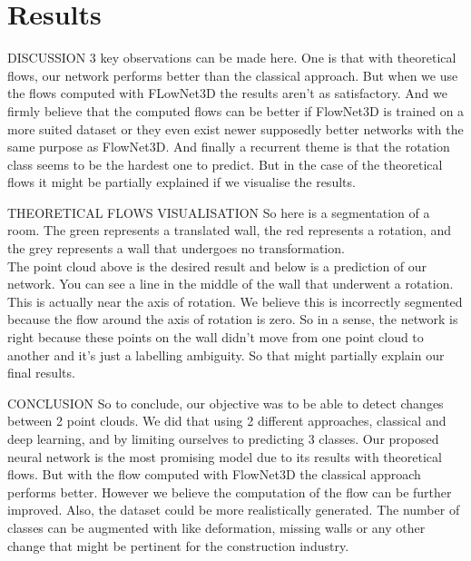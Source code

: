 \section{Results}
DISCUSSION
3 key observations can be made here. One is that with theoretical flows, our network performs better than the classical approach. But when we use the flows computed with FLowNet3D the results aren't as satisfactory. And we firmly believe that the computed flows can be better if FlowNet3D is trained on a more suited dataset or they even exist newer supposedly better networks with the same purpose as FlowNet3D. And finally a recurrent theme is that the rotation class seems to be the hardest one to predict. But in the case of the theoretical flows it might be partially explained if we visualise the results.

THEORETICAL FLOWS VISUALISATION
So here is a segmentation of a room. The green represents a translated wall, the red represents a rotation, and the grey represents a wall that undergoes no transformation.\\
The point cloud above is the desired result and below is a prediction of our network. You can see a line in the middle of the wall that underwent a rotation. This is actually near the axis of rotation. We believe this is incorrectly segmented because the flow around the axis of rotation is zero. So in a sense, the network is right because these points on the wall didn't move from one point cloud to another and it's just a labelling ambiguity. So that might partially explain our final results.

CONCLUSION
So to conclude, our objective was to be able to detect changes between 2 point clouds. We did that using 2 different approaches, classical and deep learning, and by limiting ourselves to predicting 3 classes. Our proposed neural network is the most promising model due to its results with theoretical flows. But with the flow computed with FlowNet3D the classical approach performs better. However we believe the computation of the flow can be further improved. Also, the dataset could be more realistically generated. The number of classes can be augmented with like deformation, missing walls or any other change that might be pertinent for the construction industry.